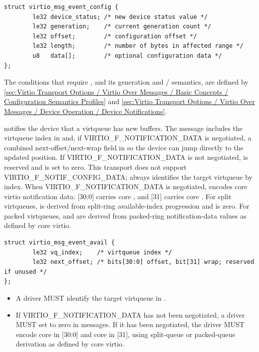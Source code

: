 \begin{lstlisting}
struct virtio_msg_event_config {
        le32 device_status; /* new device status value */
        le32 generation;    /* current generation count */
        le32 offset;        /* configuration offset */
        le32 length;        /* number of bytes in affected range */
        u8   data[];        /* optional configuration data */
};
\end{lstlisting}

The conditions that require , and its generation and
/ semantics, are defined by
\ref{sec:Virtio Transport Options / Virtio Over Messages / Basic Concepts / Configuration Semantics Profiles}
and
\ref{sec:Virtio Transport Options / Virtio Over Messages / Device Operation / Device Notifications}.


 notifies the device that a virtqueue has new buffers. The
message includes the virtqueue index in  and, if
VIRTIO\_F\_NOTIFICATION\_DATA is negotiated, a combined next-offset/next-wrap
field in  so the device can jump directly to the updated
position. If VIRTIO\_F\_NOTIFICATION\_DATA is not negotiated, 
is reserved and is set to zero. This transport does not support
VIRTIO\_F\_NOTIF\_CONFIG\_DATA;  always identifies the target
virtqueue by index. When VIRTIO\_F\_NOTIFICATION\_DATA is negotiated,
 encodes core virtio notification data:
[30:0] carries core , and
[31] carries core . For split virtqueues,
 is derived from split-ring available-index progression and
 is zero. For packed virtqueues,  and
 are derived from packed-ring notification-data values as
defined by core virtio.

\begin{lstlisting}
struct virtio_msg_event_avail {
        le32 vq_index;    /* virtqueue index */
        le32 next_offset; /* bits[30:0] offset, bit[31] wrap; reserved if unused */
};
\end{lstlisting}

\begin{itemize}
  \item A driver MUST identify the target virtqueue in .
  \item If VIRTIO\_F\_NOTIFICATION\_DATA has not been negotiated, a driver MUST
        set  to zero in  messages. If it
        has been negotiated, the driver MUST encode core  in
        [30:0] and core  in
        [31], using split-queue or packed-queue derivation
        as defined by core virtio.
\end{itemize}

